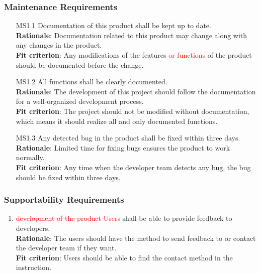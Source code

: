 \documentclass{article}
\begin{document}
\subsubsection{Maintenance Requirements}
\begin{enumerate}
    \item[MS1.1] Documentation of this product shall be kept up to date.\\
    \textbf{Rationale}: Documentation related to this product may change along with any changes in the product. \\
    \textbf{Fit criterion}: Any modifications of the features \textcolor{red}{or functions}
    of the product should be documented before the change.\\
    
    \item[MS1.2] All functions shall be clearly documented.\\
    \textbf{Rationale}: The development of this project should follow the documentation for a well-organized development process.\\
    \textbf{Fit criterion}: The project should not be modified without documentation, which means it should realize all and only documented functions.\\
    
    \item[MS1.3] Any detected bug in the product shall be fixed within three days.\\
    \textbf{Rationale}: Limited time for fixing bugs ensures the product to work normally.\\
    \textbf{Fit criterion}: Any time when the developer team detects any bug, the bug should be fixed within three days.
\end{enumerate}

\subsubsection{Supportability Requirements}
\begin{enumerate}[MS2.1]
    \item \textcolor{red}{\st{development of the product} Users} shall be able to provide
    feedback to developers.\\
    \textbf{Rationale}: The users should have the method to send feedback to or contact the developer
     team if they want. \\
    \textbf{Fit criterion}: Users should be able to find the contact method in the instruction.\\
\end{enumerate}
\end{document}
